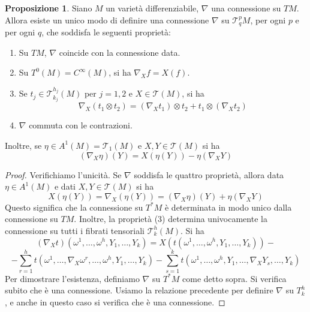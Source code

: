 \documentclass[a4paper,11pt]{article}
\theoremstyle{definition}
\theoremstyle{theorem}
\newtheorem{proposizione}{Proposizione}[section]
\newcommand{\T}{\mathcal{T}}
\begin{document}
\begin{proposizione}
	Siano $M$ un varietà differenziabile, $\nabla$ una connessione su $TM$. Allora esiste un unico modo di definire una connessione $\nabla$ su $\T^p_qM$, per ogni $p$ e per ogni $q$, che soddisfa le seguenti proprietà:
	\begin{enumerate}
		\item Su $TM$, $\nabla$ coincide con la connessione data.
		\item Su $T^0(M)=C^\infty(M)$, si ha $\nabla_Xf=X(f)$.
		\item Se $t_j\in\T^{h_j}_{k_j}(M)$ per $j=1,2$ e $X\in\T(M)$, si ha
		\[\nabla_X(t_1\otimes t_2)=\left(\nabla_Xt_1\right)\otimes t_2+t_1\otimes\left(\nabla_Xt_2\right)\]
		\item $\nabla$ commuta con le contrazioni.
	\end{enumerate}
	Inoltre, se $\eta\in A^1(M)=\T_1(M)$ e $X,Y\in\T(M)$ si ha
	\[\left(\nabla_X\eta\right)(Y)=X(\eta(Y))-\eta\left(\nabla_XY\right)\]
\end{proposizione}
\begin{proof}
	Verifichiamo l'unicità. Se $\nabla$ soddisfa le quattro proprietà, allora data $\eta\in A^1(M)$ e dati $X,Y\in\T(M)$ si ha
	\[X(\eta(Y))=\nabla_X(\eta(Y))=\left(\nabla_X\eta\right)(Y)+\eta\left(\nabla_XY\right)\]
	Questo significa che la connessione su $T^*M$ è determinata in modo unico dalla connessione su $TM$. Inoltre, la proprietà (3) determina univocamente la connessione su tutti i fibrati tensoriali $\T^h_k(M)$. Si ha
	\[\left(\nabla_Xt\right)(\omega^1,\dots,\omega^h,Y_1,\dots,Y_k)=X\left(t(\omega^1,\dots,\omega^h,Y_1,\dots,Y_k)\right)-\]\[-\sum_{r=1}^{h}t(\omega^1,\dots,\nabla_X\omega^r,\dots,\omega^h,Y_1,\dots,Y_k)-\sum_{s=1}^{k}t(\omega^1,\dots,\omega^h,Y_1,\dots,\nabla_XY_s,\dots,Y_k)\]
	Per dimostrare l'esistenza, definiamo $\nabla$ su $T^*M$ come detto sopra. Si verifica subito che è una connessione. Usiamo la relazione precedente per definire $\nabla$ su $T^h_k$, e anche in questo caso si verifica che è una connessione.
\end{proof}
\end{document}
